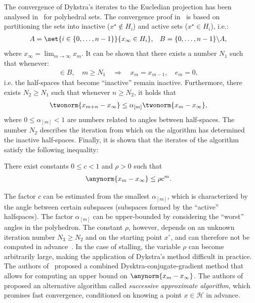 The convergence of Dykstra's iterates to the Eucledian projection has been analysed in~\cite{DYKSTRAPOLY,DYKSTRAPOLY2,DYKSTRAPERKINS} for polyhedral sets. The convergence proof in~\cite{DYKSTRAPOLY} is based on partitioning the sets into inactive ($x^\star\not\in H_i$) and active sets ($x^\star\in H_i$), i.e.:\
\begin{align}
&A=\set{i\in\lbrace 0,\dots,n-1\rbrace}{x_\infty\in H_i},
&B=\lbrace 0,\dots,n-1\rbrace\backslash A,
\end{align}
where $x_\infty=\lim_{m\rightarrow\infty}x_m$. It can be shown that there exists a number $N_1$ such that whenever:
\begin{align}
[m]\in B,\quad m\geq N_1\quad\Rightarrow\quad x_m=x_{m-1},\quad e_m=0,
\end{align}
i.e. the half-spaces that become ``inactive'' remain inactive. Furthermore, there exists $N_2\geq N_1$ such that whenever $n\geq N_2$, it holds that
\begin{align}\label{eq:dykstra:error:poly2}
\twonorm{x_{m+n}-x_\infty}\leq\alpha_{[m]}\twonorm{x_m-x_\infty},
\end{align}
where $0\leq\alpha_{[m]}<1$ are numbers related to angles between half-spaces. The number $N_2$ describes the iteration from which on the algorithm has determined the inactive half-spaces. Finally, it is shown that the iterates of the algorithm satisfy the following inequality:
\begin{theorem}
There exist constants $0\leq c < 1$ and $\rho > 0$ such that
\begin{align*}
\anynorm{x_m -x_\infty} \leq \rho c^m.
\end{align*}
\end{theorem}
The factor $c$ can be estimated from the smallest $\alpha_{[m]}$, which is characterized by the angle between certain subspaces (subspaces formed by the ``active'' halfspaces). The factor $\alpha_{[m]}$ can be upper-bounded by considering the ``worst'' angles in the polyhedron. The constant $\rho$, however, depends on an unknown iteration number $N_3\geq N_2$ and on the starting point $x^\circ$, and can therefore not be computed in advance~\cite{DYKSTRAPERKINS,XUPOLY}. In the case of stalling, the variable $\rho$ can become arbitrarily large, making the application of Dykstra's method difficult in practice. The authors of~\cite{DYKSTRAPERKINS} proposed a combined Dysktra-conjugate-gradient method that allows for computing an upper bound on $\anynorm{x_m -x_\infty}$. The authors of~\cite{XUPOLY} proposed an alternative algorithm called \emph{successive approximate algorithm}, which promises fast convergence, conditioned on knowing a point $x\in\mathcal{H}$ in advance.

